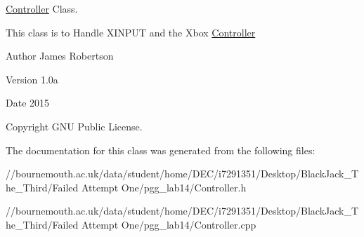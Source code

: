 \hyperlink{class_controller}{Controller} Class. 

This class is to Handle X\+I\+N\+P\+U\+T and the Xbox \hyperlink{class_controller}{Controller} \begin{DoxyAuthor}{Author}
James Robertson 
\end{DoxyAuthor}
\begin{DoxyVersion}{Version}
1.\+0a 
\end{DoxyVersion}
\begin{DoxyDate}{Date}
2015 
\end{DoxyDate}
\begin{DoxyCopyright}{Copyright}
G\+N\+U Public License. 
\end{DoxyCopyright}


The documentation for this class was generated from the following files\+:\begin{DoxyCompactItemize}
\item 
//bournemouth.\+ac.\+uk/data/student/home/\+D\+E\+C/i7291351/\+Desktop/\+Black\+Jack\+\_\+\+The\+\_\+\+Third/\+Failed Attempt One/pgg\+\_\+lab14/Controller.\+h\item 
//bournemouth.\+ac.\+uk/data/student/home/\+D\+E\+C/i7291351/\+Desktop/\+Black\+Jack\+\_\+\+The\+\_\+\+Third/\+Failed Attempt One/pgg\+\_\+lab14/Controller.\+cpp\end{DoxyCompactItemize}
